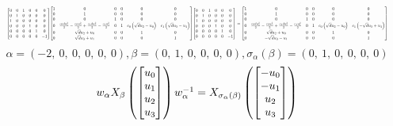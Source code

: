 \documentclass[11pt]{article}
\theoremstyle{definition}
\begin{document}
\[
\scaletoalign{\textwidth}{{\left[\begin{matrix}0 & 0 & 1 & 0 & 0 & 0\\0 & 1 & 0 & 0 & 0 & 0\\1 & 0 & 0 & 0 & 0 & 0\\0 & 0 & 0 & 1 & 0 & 0\\0 & 0 & 0 & 0 & 1 & 0\\0 & 0 & 0 & 0 & 0 & -1\end{matrix}\right]} {\left[\begin{matrix}1 & 0 & 0 & 0 & 0 & 0\\0 & 1 & 0 & 0 & 0 & 0\\0 & 0 & 1 & 0 & 0 & 0\\0 & \frac{c_{0} d u_{2}^{2}}{2} - \frac{c_{0} u_{0}^{2}}{2} + \frac{c_{1} d u_{3}^{2}}{2} - \frac{c_{1} u_{1}^{2}}{2} & 0 & 1 & c_{0} \left(\sqrt{d} u_{2} - u_{0}\right) & c_{1} \left(\sqrt{d} u_{3} - u_{1}\right)\\0 & \sqrt{d} u_{2} + u_{0} & 0 & 0 & 1 & 0\\0 & \sqrt{d} u_{3} + u_{1} & 0 & 0 & 0 & 1\end{matrix}\right]} {\left[\begin{matrix}0 & 0 & 1 & 0 & 0 & 0\\0 & 1 & 0 & 0 & 0 & 0\\1 & 0 & 0 & 0 & 0 & 0\\0 & 0 & 0 & 1 & 0 & 0\\0 & 0 & 0 & 0 & 1 & 0\\0 & 0 & 0 & 0 & 0 & -1\end{matrix}\right]} = {\left[\begin{matrix}1 & 0 & 0 & 0 & 0 & 0\\0 & 1 & 0 & 0 & 0 & 0\\0 & 0 & 1 & 0 & 0 & 0\\0 & \frac{c_{0} d u_{2}^{2}}{2} - \frac{c_{0} u_{0}^{2}}{2} + \frac{c_{1} d u_{3}^{2}}{2} - \frac{c_{1} u_{1}^{2}}{2} & 0 & 1 & c_{0} \left(\sqrt{d} u_{2} - u_{0}\right) & c_{1} \left(- \sqrt{d} u_{3} + u_{1}\right)\\0 & \sqrt{d} u_{2} + u_{0} & 0 & 0 & 1 & 0\\0 & - \sqrt{d} u_{3} - u_{1} & 0 & 0 & 0 & 1\end{matrix}\right]}}
\]
\[
\alpha = \left( -2, \  0, \  0, \  0, \  0, \  0\right), \beta = \left( 0, \  1, \  0, \  0, \  0, \  0\right), \sigma_{\alpha}(\beta) = \left( 0, \  1, \  0, \  0, \  0, \  0\right)
\]
\[
\scaletoalign{\textwidth}{w_{\alpha} X_{\beta}\left(\left[\begin{matrix}u_{0}\\u_{1}\\u_{2}\\u_{3}\end{matrix}\right]\right) w_{\alpha}^{-1} = X_{\sigma_{\alpha}\left(\beta\right)}\left(\left[\begin{matrix}- u_{0}\\- u_{1}\\u_{2}\\u_{3}\end{matrix}\right]\right)}
\]
\end{document}
